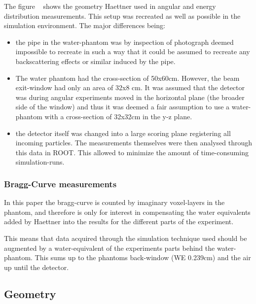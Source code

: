 The figure ~\cite{fig:haettnersetup3} shows the geometry Haettner used in angular and energy distribution measurements. This setup was recreated as well as possible  in the simulation environment. The major differences being:
\begin{itemize}
\item the pipe in the water-phantom was by inspection of photograph \cite{fig:haettnersetup2} deemed impossible to recreate in such a way that it could be assumed to recreate any backscattering effects or similar induced by the pipe.
\item The water phantom had the cross-section of 50x60cm. However, the beam exit-window had only an area of 32x8 cm. It was assumed that the detector was during angular experiments moved in the horizontal plane (the broader side of the window) and thus it was deemed a fair assumption to use a water-phantom with a cross-section of 32x32cm in the y-z plane. 
\item the detector itself was changed into a large scoring plane registering all incoming particles. The measurements themselves were then analysed through this data in ROOT. This allowed to minimize the amount of time-consuming simulation-runs.
\end{itemize}

\subsubsection{Bragg-Curve measurements}
In this paper the bragg-curve is counted by imaginary voxel-layers in the phantom, and therefore is only for interest in compensating the water equivalents added by Haettner into the results for the different parts of the experiment.

This means that data acquired through the simulation technique used should be augmented by a water-equivalent of the experiments parts behind the water-phantom. This sums up to the phantoms back-window (WE 0.239cm) and the air up until the detector.



\subsection{Geometry}

